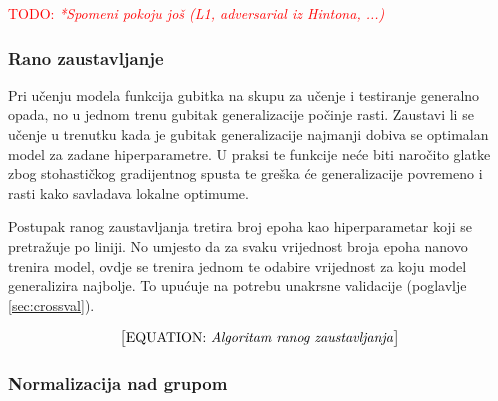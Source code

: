 \documentclass[times, utf8, numeric, diplomski]{fer}
\def\secref#1{(poglavlje \ref{#1})}
\def\TODO#1{\noindent\textcolor{red}{TODO: \textit{#1}}\newline}
\def\todo#1{\TODO{#1}}
\def\todoeq#1{\textcolor{red}{\begin{equation}\text{\big[EQUATION: \textit{#1}\big]}\end{equation}}}
\begin{document}
\todo{*Spomeni pokoju još (L1, adversarial iz Hintona, ...)}
%

\subsubsection{Rano zaustavljanje}
Pri učenju modela funkcija gubitka na skupu za učenje i testiranje generalno opada, no u jednom trenu gubitak generalizacije počinje rasti. Zaustavi li se učenje u trenutku kada je gubitak generalizacije najmanji dobiva se optimalan model za zadane hiperparametre. U praksi te funkcije neće biti naročito glatke zbog stohastičkog gradijentnog spusta te greška će generalizacije povremeno i rasti kako savladava lokalne optimume.

Postupak ranog zaustavljanja tretira broj epoha kao hiperparametar koji se pretražuje po liniji. No umjesto da za svaku vrijednost broja epoha nanovo trenira model, ovdje se trenira jednom te odabire vrijednost za koju model generalizira najbolje. To upućuje na potrebu unakrsne validacije \secref{sec:crossval}.

\todoeq{Algoritam ranog zaustavljanja}

\subsubsection{Normalizacija nad grupom}
\end{document}
